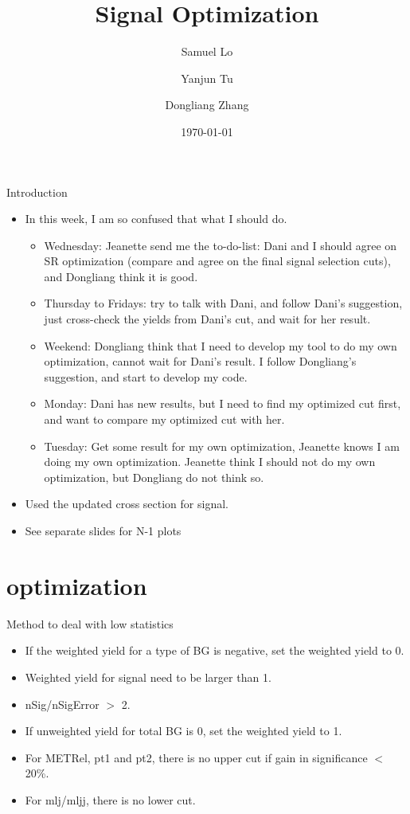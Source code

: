 \documentclass[mathserif,serif]{beamer}
\title[]{Signal Optimization}
\author[]
{
Samuel Lo \inst{1}
\and
Yanjun Tu  \inst{1}
\and
Dongliang Zhang  \inst{2}
}
\institute[]
{
\inst{1}
The University of Hong Kong
\and
\inst{2}
University of Michigan
}
\date[]{\today}
\begin{document}
\frame{\titlepage}

\begin{frame}{Introduction}
\begin{itemize}
\item In this week, I am so confused that what I should do.
\begin{itemize}
\item Wednesday: Jeanette send me the to-do-list: Dani and I should agree on SR optimization (compare and agree on the final signal selection cuts), and Dongliang think it is good.
\item Thursday to Fridays: try to talk with Dani, and follow Dani's suggestion, just cross-check the yields from Dani's cut, and wait for her result.
\item Weekend: Dongliang think that I need to develop my tool to do my own optimization, cannot wait for Dani's result. I follow Dongliang's suggestion, and start to develop my code.
\item Monday: Dani has new results, but I need to find my optimized cut first, and want to compare my optimized cut with her.
\item Tuesday: Get some result for my own optimization, Jeanette knows I am doing my own optimization. Jeanette think I should not do my own optimization, but Dongliang do not think so.
\end{itemize}
\item Used the updated cross section for signal.
\item See separate slides for N-1 plots
\end{itemize}
\end{frame}

\section{optimization}
\begin{frame}{Method to deal with low statistics}
\begin{itemize}
\item If the weighted yield for a type of BG is negative, set the weighted yield to 0.
\item Weighted yield for signal need to be larger than 1.
\item nSig/nSigError $>$ 2.
\item If unweighted yield for total BG is 0, set the weighted yield to 1.
\item For METRel, pt1 and pt2, there is no upper cut if gain in significance $<$ 20\%.
\item For mlj/mljj, there is no lower cut.
\end{itemize}
\end{frame}
\end{document}
